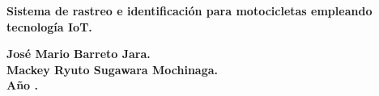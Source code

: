 \documentclass[12pt,a4paper,oneside]{book}
\begin{document}
\vspace{3 cm}
{
\noindent
\begin{center}
\huge \bf Sistema de rastreo e
identificación para motocicletas
empleando tecnología IoT.
\end{center}
}


\vspace{5 cm}

\begin{center}
{\textbf{\Large José Mario Barreto Jara.}\\[5mm]
\textbf{\Large Mackey Ryuto Sugawara Mochinaga.}\\[5mm]
\vspace{1 cm}
\textbf{Año \the\year.}}
\end{center}









\cleardoublepage


\cleardoublepage

\tableofcontents

\cleardoublepage

\listoffigures
{}
\cleardoublepage

\listoftables
{}




{}
\printglossary[type=\acronymtype] %

\mainmatter
{} %








\backmatter

% 
\end{document}
